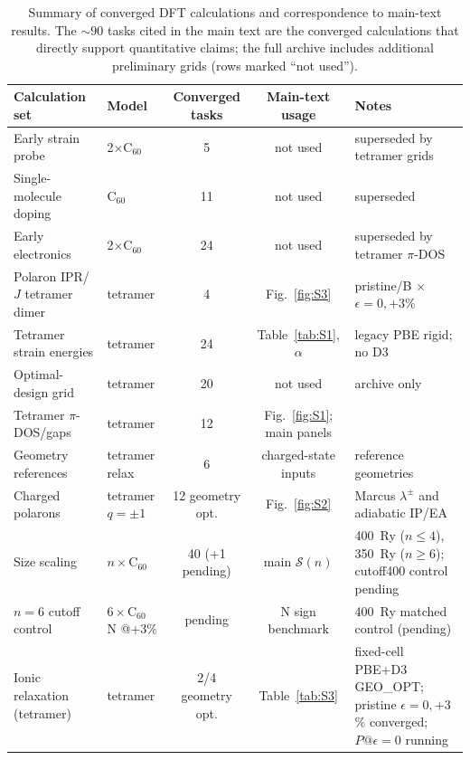 \begin{table}[t]
\caption{\label{tab:S2}Summary of converged DFT calculations and correspondence to main-text results.
The $\sim 90$ tasks cited in the main text are the converged calculations that directly support quantitative claims; the full archive includes additional preliminary grids (rows marked ``not used'').}
\begin{ruledtabular}
\begin{tabular}{llccl}
Calculation set & Model & Converged tasks & Main-text usage & Notes \\
\hline
Early strain probe & 2$\times$C$_{60}$ & 5 & not used & superseded by tetramer grids \\
Single-molecule doping & C$_{60}$ & 11 & not used & superseded \\
Early electronics & 2$\times$C$_{60}$ & 24 & not used & superseded by tetramer $\pi$-DOS \\
Polaron IPR/$J$ tetramer dimer & tetramer & 4 & Fig.~\ref{fig:S3} & pristine/B $\times$ $\epsilon{=}0,+3$\% \\
Tetramer strain energies & tetramer & 24 & Table~\ref{tab:S1}, $\alpha$ & legacy PBE rigid; no D3 \\
Optimal-design grid & tetramer & 20 & not used & archive only \\
Tetramer $\pi$-DOS/gaps & tetramer & 12 & Fig.~\ref{fig:S1}; main panels & \\
Geometry references & tetramer relax & 6 & charged-state inputs & reference geometries \\
Charged polarons & tetramer $q=\pm1$ & 12 geometry opt. & Fig.~\ref{fig:S2} & Marcus $\lambda^{\pm}$ and adiabatic IP/EA \\
Size scaling & $n\times$C$_{60}$ & 40 (+1 pending) & main $\mathcal{S}(n)$ & 400~Ry ($n\leq4$), 350~Ry ($n\geq6$); cutoff400 control pending \\
$n{=}6$ cutoff control & $6\times$C$_{60}$ N @+3\% & pending & N sign benchmark & 400~Ry matched control (pending) \\
Ionic relaxation (tetramer) & tetramer & 2/4 geometry opt. & Table~\ref{tab:S3} & fixed-cell PBE+D3 GEO\_OPT; pristine $\epsilon{=}0,+3$\% converged; $P@\epsilon{=}0$ running \\
\end{tabular}
\end{ruledtabular}
\end{table}
